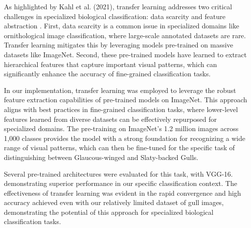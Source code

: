 \documentclass[a4paper,12pt]{article}
\begin{document}
As highlighted by Kahl et al. (2021), transfer learning addresses two critical challenges in specialized biological classification: data scarcity and feature abstraction \citet{kahl2021}. First, data scarcity is a common issue in specialized domains like ornithological image classification, where large-scale annotated datasets are rare. Transfer learning mitigates this by leveraging models pre-trained on massive datasets like ImageNet. Second, these pre-trained models have learned to extract hierarchical features that capture important visual patterns, which can significantly enhance the accuracy of fine-grained classification tasks.

In our implementation, transfer learning was employed to leverage the robust feature extraction capabilities of pre-trained models on ImageNet. This approach aligns with best practices in fine-grained classification tasks, where lower-level features learned from diverse datasets can be effectively repurposed for specialized domains. The pre-training on ImageNet's 1.2 million images across 1,000 classes provides the model with a strong foundation for recognizing a wide range of visual patterns, which can then be fine-tuned for the specific task of distinguishing between Glaucous-winged and Slaty-backed Gulls.

Several pre-trained architectures were evaluated for this task, with VGG-16. \citet{simonyan2014vgg} demonstrating superior performance in our specific classification context. The effectiveness of transfer learning was evident in the rapid convergence and high accuracy achieved even with our relatively limited dataset of gull images, demonstrating the potential of this approach for specialized biological classification tasks.

\newpage


\end{document}

